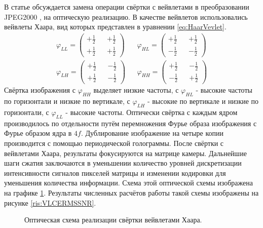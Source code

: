 \FloatBarrier\par
В статье \cite{alkholidi2008real} обсуждается замена операции свёртки с вейвлетами в преобразовании JPEG2000 \cite{lawson2002image}, на оптическую реализацию. В качестве вейвлетов использовались вейвлеты Хаара, вид которых представлен в уравнении \ref{eq:HaarVevlet}.
\begin{equation}\label{eq:HaarVevlet}
	\begin{matrix}
		\varphi_{LL} = 
			\left(\begin{matrix} 
				+\frac{1}{2} && +\frac{1}{2} \\ +\frac{1}{2} && +\frac{1}{2} 
			\end{matrix}\right)
		&&
		\varphi_{HL} = 
		\left(\begin{matrix} 
			+\frac{1}{2} && +\frac{1}{2} \\ -\frac{1}{2} && -\frac{1}{2} 
		\end{matrix}\right)
		\\
		\varphi_{LH} = 
		\left(\begin{matrix} 
			+\frac{1}{2} && -\frac{1}{2} \\ +\frac{1}{2} && -\frac{1}{2} 
		\end{matrix}\right)
		&&
		\varphi_{HH} = 
		\left(\begin{matrix} 
			+\frac{1}{2} && -\frac{1}{2} \\ -\frac{1}{2} && +\frac{1}{2} 
		\end{matrix}\right)
	\end{matrix}
\end{equation}
Свёртка изображения с $\varphi_{HH}$ выделяет низкие частоты, с $\varphi_{HL}$ - высокие частоты по горизонтали и низкие по вертикале, с $\varphi_{LH}$ - высокие по вертикале и низкие по горизонтали, с $\varphi_{LL}$ - высокие частоты. Оптически свёртка с каждым ядром производилось по отдельности путём перемножения Фурье образа изображения с Фурье образом ядра в $4f$. Дублирование изображение на четыре копии производится с помощью периодической голограммы. После свёртки с вейвлетами Хаара, результаты фокусируются на матрице камеры. Дальнейшие шаги сжатия заключаются в уменьшении количество уровней дискретизации интенсивности сигналов пикселей матрицы и изменении кодировки для уменьшения количества информации. Схема этой оптической схемы изображена на графике \ref{ris:JPEG2000}. Результаты численных расчётов работы такой схемы изображены на рисунке \ref{ris:VLCERMSSNR}.
\begin{figure}[h]
	\caption{Оптическая схема реализации свёртки вейвлетами Хаара.}
	\label{ris:JPEG2000}
\end{figure}
